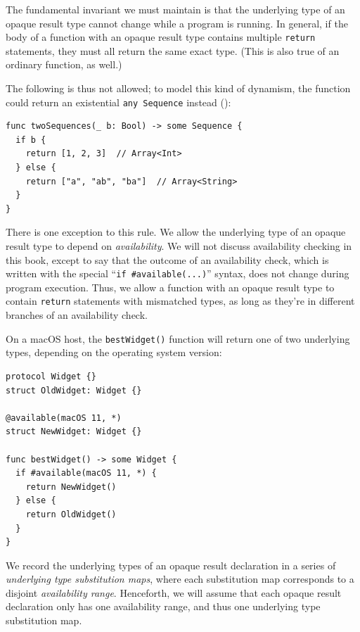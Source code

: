 \documentclass[../generics]{subfiles}
\begin{document}
The fundamental invariant we must maintain is that the underlying type of an opaque result type cannot change while a program is running. In general, if the body of a function with an opaque result type contains multiple \texttt{return} statements, they must all return the same exact type. (This is also true of an ordinary function, as well.)
\begin{example}
The following is thus not allowed; to model this kind of dynamism, the function could return an existential \verb|any Sequence| instead ():
\begin{Verbatim}
func twoSequences(_ b: Bool) -> some Sequence {
  if b {
    return [1, 2, 3]  // Array<Int>
  } else {
    return ["a", "ab", "ba"]  // Array<String>
  }
}
\end{Verbatim}
\end{example}
There is one exception to this rule. We allow the underlying type of an opaque result type to depend on \emph{availability}. We will not discuss availability checking in this book, except to say that the outcome of an availability check, which is written with the special ``\verb|if #available(...)|'' syntax, does not change during program execution. Thus, we allow a function with an opaque result type to contain \texttt{return} statements with mismatched types, as long as they're in different branches of an availability check.
\begin{example}
On a macOS host, the \texttt{bestWidget()} function will return one of two underlying types, depending on the operating system version:
\begin{Verbatim}
protocol Widget {}
struct OldWidget: Widget {}

@available(macOS 11, *)
struct NewWidget: Widget {}

func bestWidget() -> some Widget {
  if #available(macOS 11, *) {
    return NewWidget()
  } else {
    return OldWidget()
  }
}
\end{Verbatim}
\end{example}

We record the underlying types of an opaque result declaration in a series of \emph{underlying type substitution maps}, where each substitution map corresponds to a disjoint \emph{availability range}. Henceforth, we will assume that each opaque result declaration only has one availability range, and thus one underlying type substitution map.
\end{document}
